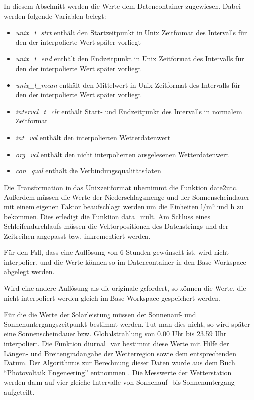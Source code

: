 
In diesem Abschnitt werden die Werte dem Datencontainer zugewiesen. Dabei werden folgende Variablen belegt:
\begin{itemize}
\item \textit{unix\_t\_strt} enthält den Startzeitpunkt in Unix Zeitformat des Intervalls für den der interpolierte Wert später vorliegt
\item \textit{unix\_t\_end} enthält den Endzeitpunkt in Unix Zeitformat des Intervalls für den der interpolierte Wert später vorliegt
\item \textit{unix\_t\_mean} enthält den Mittelwert in Unix Zeitformat des Intervalls für den der interpolierte Wert später vorliegt
\item \textit{interval\_t\_clr} enthält Start- und Endzeitpunkt des Intervalls in normalem Zeitformat
\item \textit{int\_val} enthält den interpolierten Wetterdatenwert
\item \textit{org\_val} enthält den nicht interpolierten ausgelesenen Wetterdatenwert
\item \textit{con\_qual} enthält die Verbindungsqualitätsdaten   
\end{itemize}
Die Transformation in das Unixzeitformat übernimmt die Funktion \textsf{date2utc}. Außerdem müssen die Werte der Niederschlagsmenge und der Sonnenscheindauer mit einem eigenen Faktor beaufschlagt werden um die Einheiten l/m² und h zu bekommen. Dies erledigt die Funktion \textsf{data\_mult}.
Am Schluss eines Schleifendurchlaufs müssen die Vektorpositionen des Datenstrings und der Zeitreihen angepasst bzw. inkrementiert werden.   
 
Für den Fall, dass eine Auflösung von 6 Stunden gewünscht ist, wird nicht interpoliert und die Werte können so im Datencontainer in den Base-Workspace abgelegt werden.
 
Wird eine andere Auflösung als die originale gefordert, so können die Werte, die nicht interpoliert werden gleich im Base-Workspace gespeichert werden.  
 
Für die die Werte der Solarleistung müssen der Sonnenauf- und Sonnenuntergangszeitpunkt bestimmt werden. Tut man dies nicht, so wird später eine Sonnenscheindauer bzw. Globalstrahlung von 0.00 Uhr bis 23.59 Uhr interpoliert. Die Funktion \textsf{diurnal\_var} bestimmt diese Werte mit Hilfe der Längen- und Breitengradangabe der Wetterregion sowie dem entsprechenden Datum. Der Algorithmus zur Berechnung dieser Daten wurde aus dem Buch \enquote{Photovoltaik Engeneering} entnommen \cite{Wagner.2006}. Die Messwerte der Wetterstation werden dann auf vier gleiche Intervalle von Sonnenauf- bis Sonnenuntergang aufgeteilt.     
